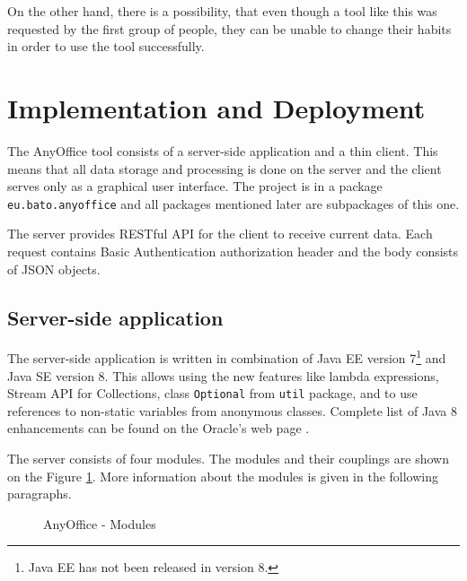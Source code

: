 \documentclass[11pt,singleside]{myfithesis2}
\newcommand{\pict}[4]{
	\begin{figure}[h!]
  		\vspace{-7px}
  		\centerline{\fcolorbox{darkgray}{palegray}{\texttt{[image: \#2]}}}
  		\caption{#1}
  		\label{#4}
	\end{figure}
}
\begin{document}
On the other hand, there is a possibility, that even though a tool like this was requested by the first group of people, they can be unable to change their habits in order to use the tool successfully.
	
	\section{Implementation and Deployment}
The AnyOffice tool consists of a server-side application and a thin client. This means that all data storage and processing is done on the server and the client serves only as a graphical user interface. The project is in a package \texttt{eu.bato.anyoffice} and all packages mentioned later are subpackages of this one.

The server provides RESTful API for the client to receive current data. Each request contains Basic Authentication authorization header and the body consists of JSON objects.


		\subsection{Server-side application}
The server-side application is written in combination of Java EE version 7\footnote{Java EE has not been released in version 8.} and Java SE version 8. This allows using the new features like lambda expressions, Stream API for Collections, class \texttt{Optional} from \texttt{util} package, and to use references to non-static variables from anonymous classes. Complete list of Java 8 enhancements can be found on the Oracle's web page \cite{java8}.

The server consists of four modules. The modules and their couplings are shown on the Figure \ref{pic:anyofficeModules}. More information about the modules is given in the following paragraphs.

\pict{AnyOffice - Modules}{data/modules.png}{width=0.8\textwidth}{pic:anyofficeModules}
\end{document}
